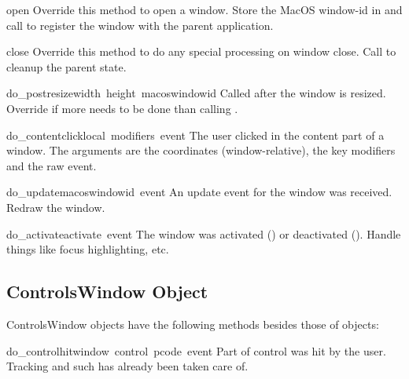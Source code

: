 \renewcommand{\indexsubitem}{(Window method)}

\begin{funcdesc}{open}{}
Override this method to open a window. Store the MacOS window-id in
 and call  to register the
window with the parent application.
\end{funcdesc}

\begin{funcdesc}{close}{}
Override this method to do any special processing on window
close. Call  to cleanup the parent state.
\end{funcdesc}

\begin{funcdesc}{do_postresize}{width\, height\, macoswindowid}
Called after the window is resized. Override if more needs to be done
than calling .
\end{funcdesc}

\begin{funcdesc}{do_contentclick}{local\, modifiers\, event}
The user clicked in the content part of a window. The arguments are
the coordinates (window-relative), the key modifiers and the raw
event.
\end{funcdesc}

\begin{funcdesc}{do_update}{macoswindowid\, event}
An update event for the window was received. Redraw the window.
\end{funcdesc}

\begin{funcdesc}{do_activate}{activate\, event}
The window was activated () or deactivated
(). Handle things like focus highlighting, etc.
\end{funcdesc}

\subsection{ControlsWindow Object}

ControlsWindow objects have the following methods besides those of
 objects:

\renewcommand{\indexsubitem}{(ControlsWindow method)}

\begin{funcdesc}{do_controlhit}{window\, control\, pcode\, event}
Part  of control  was hit by the
user. Tracking and such has already been taken care of.
\end{funcdesc}

